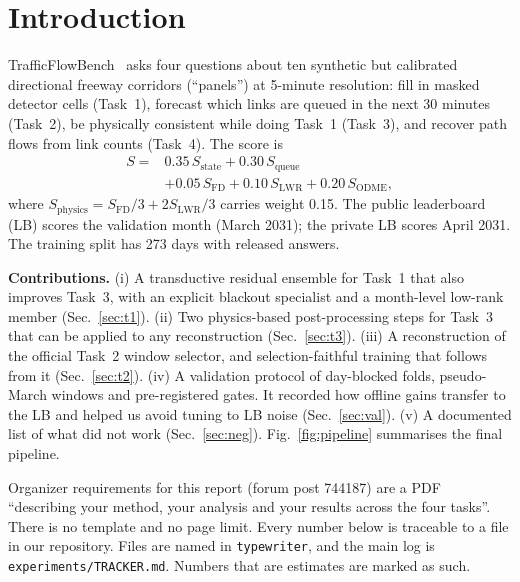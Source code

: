 \documentclass[conference,10pt]{IEEEtran}
\newcommand{\file}[1]{\texttt{\small #1}}
\begin{document}
\section{Introduction}
TrafficFlowBench~\cite{tfb} asks four questions about ten synthetic but calibrated directional freeway corridors
(``panels'') at 5-minute resolution: fill in masked detector cells (Task~1), forecast which links are queued in
the next 30 minutes (Task~2), be physically consistent while doing Task~1 (Task~3), and recover path flows from link
counts (Task~4). The score is
\begin{equation}
\begin{split}
S = {}&0.35\,S_\text{state} + 0.30\,S_\text{queue}\\
&+ 0.05\,S_\text{FD} + 0.10\,S_\text{LWR} + 0.20\,S_\text{ODME},
\end{split}
\label{eq:score}
\end{equation}
where $S_\text{physics}=S_\text{FD}/3+2S_\text{LWR}/3$ carries weight 0.15. The public leaderboard (LB) scores the
validation month (March 2031); the private LB scores April 2031. The training split has 273 days with released
answers.

\textbf{Contributions.}
(i) A transductive residual ensemble for Task~1 that also improves Task~3, with an explicit blackout specialist and a
month-level low-rank member (Sec.~\ref{sec:t1}).
(ii) Two physics-based post-processing steps for Task~3 that can be applied to any reconstruction (Sec.~\ref{sec:t3}).
(iii) A reconstruction of the official Task~2 window selector, and selection-faithful training that follows from it
(Sec.~\ref{sec:t2}).
(iv) A validation protocol of day-blocked folds, pseudo-March windows and pre-registered gates. It recorded how
offline gains transfer to the LB and helped us avoid tuning to LB noise (Sec.~\ref{sec:val}).
(v) A documented list of what did not work (Sec.~\ref{sec:neg}). Fig.~\ref{fig:pipeline} summarises the final pipeline.

Organizer requirements for this report (forum post 744187) are a PDF ``describing your method, your analysis and
your results across the four tasks''. There is no template and no page limit. Every number below is traceable to a file in
our repository. Files are named in \file{typewriter}, and the main log is \file{experiments/TRACKER.md}. Numbers
that are estimates are marked as such.
\end{document}
